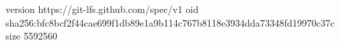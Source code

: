 version https://git-lfs.github.com/spec/v1
oid sha256:bfc8bcf2f44cae699f1db89e1a9b114c767b8118e3934dda73348fd19970c37c
size 5592560
